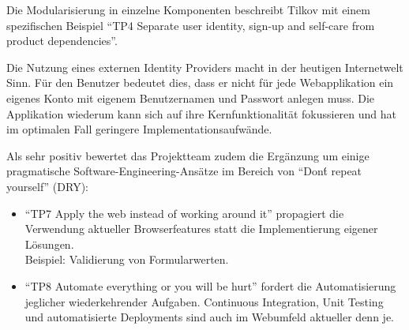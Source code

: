 Die Modularisierung in einzelne Komponenten beschreibt Tilkov mit einem spezifischen Beispiel ``TP4 Separate user identity, sign-up and self-care from product dependencies''.

Die Nutzung eines externen Identity Providers macht in der heutigen Internetwelt Sinn. Für den Benutzer bedeutet dies, dass er nicht für jede Webapplikation ein eigenes Konto mit eigenem Benutzernamen und Passwort anlegen muss. Die Applikation wiederum kann sich auf ihre Kernfunktionalität fokussieren und hat im optimalen Fall geringere Implementationsaufwände.

Als sehr positiv bewertet das Projektteam zudem die Ergänzung um einige pragmatische Software-Engineering-Ansätze im Bereich von ``Don\'t repeat yourself'' (DRY):

\begin{itemize}
	\item ``TP7 Apply the web instead of working around it'' propagiert die Verwendung aktueller Browserfeatures statt die Implementierung eigener Lösungen.\\
	Beispiel: Validierung von Formularwerten.
	\item ``TP8 Automate everything or you will be hurt'' fordert die Automatisierung jeglicher wiederkehrender Aufgaben. Continuous Integration, Unit Testing und automatisierte Deployments sind auch im Webumfeld aktueller denn je.
\end{itemize}